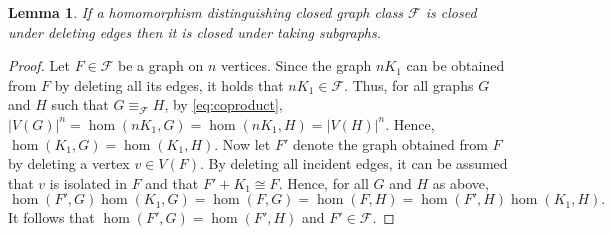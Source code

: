 \documentclass[3p,final]{elsarticle}
\newtheorem{lemma}[theorem]{Lemma}
\begin{document}
	\begin{lemma} \label{lem:minors}
		If a homomorphism distinguishing closed graph class $\mathcal{F}$ is closed under deleting edges then it is closed under taking subgraphs.
	\end{lemma}
	\begin{proof}%
		Let $F \in \mathcal{F}$ be a graph on $n$ vertices. Since the graph $nK_1$ can be obtained from $F$ by deleting all its edges, it holds that $nK_1 \in \mathcal{F}$.
		Thus, for all graphs $G$ and $H$ such that $G \equiv_{\mathcal{F}} H$, by \cref{eq:coproduct},
		$|V(G)|^n = \hom(nK_1, G) = \hom(nK_1, H)  = |V(H)|^n$.
		Hence, $\hom(K_1, G) = \hom(K_1, H)$.
		Now let $F'$ denote the graph obtained from $F$ by deleting a vertex $v \in V(F)$.
		By deleting all incident edges, it can be assumed that $v$ is isolated in $F$ and that $F' + K_1 \cong F$. 
		Hence, for all $G$ and $H$ as above,
		\[
		\hom(F', G)\hom(K_1, G) = \hom(F, G) = \hom(F, H) = \hom(F', H)\hom(K_1, H).
		\]
		It follows that $\hom(F', G) = \hom(F', H)$ and $F' \in \mathcal{F}$.
	\end{proof}
	
	
	
	
	

	
	
\end{document}
